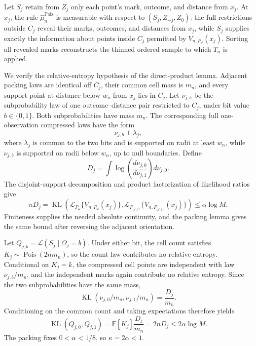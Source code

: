 Let \(S_j\) retain from \(Z_j\) only each point's mark, outcome, and distance from \(x_j\).  At \(x_j\), the rule \(\widehat\mu_n^{\mathrm{Pois}}\) is measurable with respect to \((S_j,Z_{-j},Z_0)\): the full restrictions outside \(C_j\) reveal their marks, outcomes, and distances from \(x_j\), while \(S_j\) supplies exactly the information about points inside \(C_j\) permitted by \(V_{n,P_\omega}(x_j)\).  Sorting all revealed marks reconstructs the thinned ordered sample to which \(T_n\) is applied.

We verify the relative-entropy hypothesis of the direct-product lemma.  Adjacent packing laws are identical off \(C_j\), their common cell mass is \(m_n\), and every support point at distance below \(w_n\) from \(x_j\) lies in \(C_j\).  Let \(\nu_{j,b}\) be the subprobability law of one outcome--distance pair restricted to \(C_j\), under bit value \(b\in\{0,1\}\).  Both subprobabilities have mass \(m_n\).  The corresponding full one-observation compressed laws have the form
\[
 \nu_{j,b}+\lambda_j,
\]
where \(\lambda_j\) is common to the two bits and is supported on radii at least \(w_n\), while \(\nu_{j,b}\) is supported on radii below \(w_n\), up to null boundaries.  Define
\[
 D_j=\int\log\!\left(\frac{d\nu_{j,0}}{d\nu_{j,1}}\right)d\nu_{j,0}.
\]
The disjoint-support decomposition and product factorization of likelihood ratios give
\[
 nD_j
 =\operatorname{KL}\!\left(
 \mathcal L_{P_\omega}\{V_{n,P_\omega}(x_j)\},
 \mathcal L_{P_{\omega^{(j)}}}\{V_{n,P_{\omega^{(j)}}}(x_j)\}
 \right)
 \leq\alpha\log M.
\]
Finiteness supplies the needed absolute continuity, and the packing lemma gives the same bound after reversing the adjacent orientation.

Let \(Q_{j,b}=\mathcal L(S_j\mid\Omega_j=b)\).  Under either bit, the cell count satisfies \(K_j\sim\operatorname{Pois}(2nm_n)\), so the count law contributes no relative entropy.  Conditional on \(K_j=k\), the compressed cell points are independent with law \(\nu_{j,b}/m_n\), and the independent marks again contribute no relative entropy.  Since the two subprobabilities have the same mass,
\[
 \operatorname{KL}(\nu_{j,0}/m_n,\nu_{j,1}/m_n)=\frac{D_j}{m_n}.
\]
Conditioning on the common count and taking expectations therefore yields
\[
 \operatorname{KL}(Q_{j,0},Q_{j,1})
 =\mathbb E[K_j]\frac{D_j}{m_n}
 =2nD_j
 \leq2\alpha\log M.
\]
The packing fixes \(0<\alpha<1/8\), so \(\kappa=2\alpha<1\).

